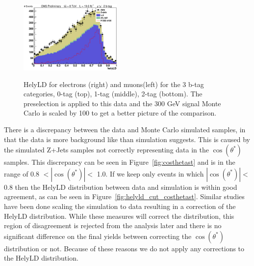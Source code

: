 \begin{figure}[htb!]
\begin{center}
{\includegraphics[width=0.45\textwidth]{presentation/defense/images/preselection/2/mu/helyLD.eps}
}
\caption{
HelyLD for electrons (right) and muons(left) for the 3 b-tag categories, 0-tag (top), 1-tag (middle), 2-tag (bottom). The preselection is applied to this data and the 300 GeV signal Monte Carlo is scaled by 100 to get a better picture of the comparison.
}
\label{fig:hely_LD}
\end{center}
\end{figure}


There is a discrepancy between the data and Monte Carlo simulated samples, in that the data is more background like than simulation suggests. This is caused by the simulated Z+Jets samples not correctly representing data in the $\cos(\theta^*)$ samples.  This discrepancy can be seen in Figure~\ref{fig:costhetast} and is in the range of 0.8 $< |\cos(\theta^*)| <$ 1.0.  If we keep only events in which $|\cos(\theta^*)| <$ 0.8 then the HelyLD distribution between data and simulation is within good agreement, as can be seen in Figure~\ref{fig:helyld_cut_costhetast}.  Similar studies have been done scaling the simulation to data resulting in a correction of the HelyLD distribution.  While these measures will correct the distribution, this region of disagreement is rejected from the analysis later and there is no significant difference on the final yields between correcting the $\cos(\theta^*)$ distribution or not. Because of these reasons we do not apply any corrections to the HelyLD distribution.


